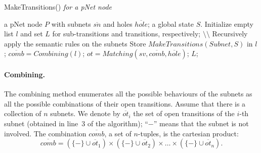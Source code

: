 \documentclass[smallcondensed]{svjour3}
\newcommand{\noteSB}[2][color=green!40, size=\tiny]{\todo[#1]{{\bf Simon: } {#2}}}
\begin{document}
\begin{algorithm}[h]
\caption{MakeTransitions() \em{for a pNet node}}
  \label{alg2}
\begin{algorithmic}[1]
\Require a pNet node $P$ with subnets $\overline{sn}$ and holes $\overline{hole}$; a global state $S$.
\State Initialize empty list $l$ and set $L$ for sub-transitions and transitions, respectively;
        \hfill $\setminus \setminus$ Recursively apply the semantic rules on the subnets
           \State Store $\mathit{MakeTransitions}(Subnet, S)$ in $l$;
	\EndFor
	\State $\overline{comb} = \mathit{Combining}(l)$;
           \State $ot = \mathit{Matching}(sv, \overline{\mathit{comb}}, \overline{\mathit{hole}})$;
	\EndFor
\State \Return $L$;
\end{algorithmic}  
\end{algorithm}



%
%


\def\inactive{\{-\}}
\paragraph{Combining.}
The combining method enumerates all the possible behaviours of the
subnets as all the possible combinations of their open transitions.
Assume that there is a collection of $n$ subnets.
We denote by $\overline{ot}_i$ the set of open
transitions of the $i$-th
subnet (obtained in line~3 of the algorithm); %
``$-$'' means that the subnet is not involved.
The combination $\overline{comb}$, a set of $n$-tuples, is the
cartesian product:  
$$\overline{comb} = (\inactive\cup \overline{ot}_1) \times (\inactive\cup \overline{ot}_2)\times \dots \times (\inactive\cup \overline{ot}_n). $$
\end{document}
